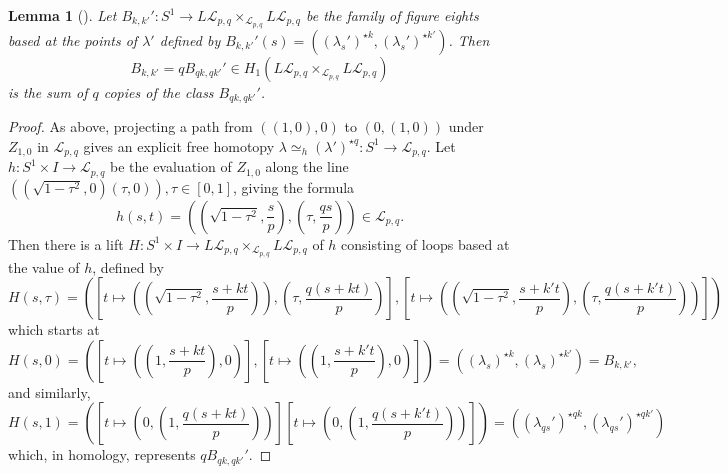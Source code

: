 \documentclass[reqno]{amsart}
\newtheorem{lemma}[theorem]{Lemma}
\theoremstyle{definition}
\theoremstyle{remark}
\begin{document}
\begin{lemma}[]\cite[Lemma 2.6]{Naef-Rivera-Wahl}
    Let $B_{k,k'}' \colon S^{1} \to L \mathcal{L}_{p,q} \times_{
    \mathcal{L}_{p,q}} L \mathcal{L}_{p,q}$ be the family of
    figure eights based at the points of $\lambda'$ defined
    by $B_{k,k'}'(s) = 
    \left( (\lambda_s')^{\star k}, (\lambda_s')^{\star k'} \right) $. Then
    \[
    B_{k,k'} = q B_{qk,qk'}' \in 
    H_1 \left( L \mathcal{L}_{p,q} 
    \times_{\mathcal{L}_{p,q}} L \mathcal{L}_{p,q} \right) 
    \] 
    is the sum of $q$ copies of the class
    $B_{qk,qk'}'$.
\end{lemma}

\begin{proof}
    As above, projecting a path from
    $\left( (1,0), 0 \right) $ to
    $\left( 0 ,(1,0) \right) $ under $Z_{1,0}$ in
    $\mathcal{L}_{p,q}$ gives an explicit free homotopy
    $\lambda \simeq_h \left( \lambda' \right)^{\star q} \colon
    S^{1} \to \mathcal{L}_{p,q}$.
    Let $h \colon S^{1} \times I \to \mathcal{L}_{p,q}$ be
    the evaluation of
    $Z_{1,0}$ along the line
    $\left( \left( \sqrt{1-\tau^2} ,0 \right) (\tau ,0) \right) ,
    \tau \in \left[ 0,1 \right] $, giving the formula
    \[
    h(s,t) = 
    \left( \left( \sqrt{1-\tau^2} , \frac{s}{p} \right) ,
    \left( \tau, \frac{qs}{p} \right) \right) \in \mathcal{L}_{p,q}. 
    \] 
    Then there is a lift
    $H \colon S^{1} \times I \to L \mathcal{L}_{p,q} \times_{\mathcal{L}_{p,q}} 
    L \mathcal{L}_{p,q}$ of $h$ consisting of loops
    based at the value of $h$, defined by
    \[
    H(s,\tau) = 
    \left( \left[ t \mapsto \left( \left( \sqrt{1- \tau^2} ,
    \frac{s+ kt}{p}\right)  \right) , 
    \left( \tau, \frac{q (s+kt)}{p} \right) \right]
    ,
    \left[ t \mapsto \left( \left( \sqrt{1- \tau^2} ,
    \frac{s+ k't}{p}\right) , 
\left( \tau, \frac{q (s+k't)}{p} \right) \right)  \right] \right)
    \] 
    which starts at 
    \[
    H(s,0) = \left( \left[ t \mapsto \left( \left( 1, \frac{s+kt}{p} \right) ,
    0 \right)  \right] ,
    \left[ t \mapsto \left( \left( 
    1 , \frac{s+k't}{p}\right) ,
0 \right)  \right] \right)
= \left( (\lambda_s)^{\star k} ,
(\lambda_s)^{\star k'} \right) = 
B_{k,k'},
    \] 
    and similarly,
    \[
    H(s,1) = 
    \left( \left[ t \mapsto 
    \left( 0,
\left( 1, \frac{q(s+kt)}{p} \right) \right) \right] 
\left[ t \mapsto \left( 0,
\left( 1, \frac{q(s+k't)}{p} \right) \right)  \right] \right) =
\left( (\lambda_{qs}')^{\star qk}, (\lambda_{qs}')^{\star qk'} \right) 
    \] 
    which, in homology, represents $q B_{qk,qk'}'$.
\end{proof}
\end{document}
